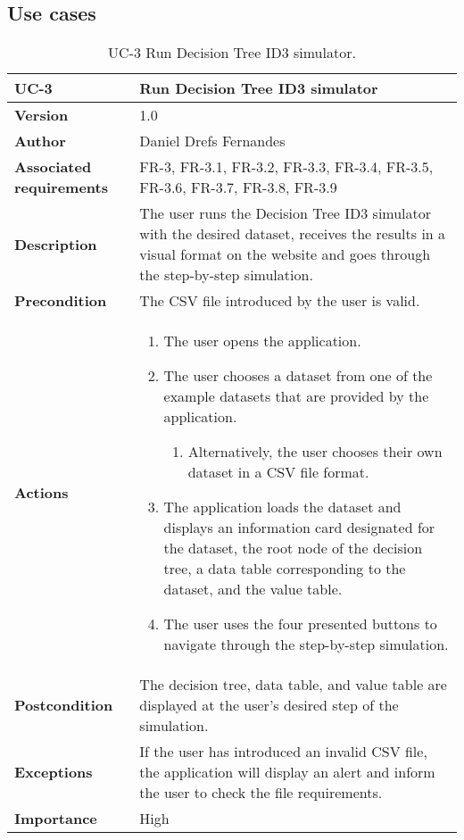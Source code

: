 \subsection{Use cases}
\begin{table}[p]
	\centering
	\begin{tabularx}{\linewidth}{ p{} p{} }
		\toprule
		\textbf{UC-3}    & \textbf{Run Decision Tree ID3 simulator}\\
		\toprule
		\textbf{Version}              & 1.0    \\
		\textbf{Author}                & Daniel Drefs Fernandes \\
		\textbf{Associated requirements} & FR-3, FR-3.1, FR-3.2, FR-3.3, FR-3.4, FR-3.5, FR-3.6, FR-3.7, FR-3.8, FR-3.9 \\
		\textbf{Description}          & The user runs the Decision Tree ID3 simulator with the desired dataset, receives the results in a visual format on the website and goes through the step-by-step simulation. \\
		\textbf{Precondition}         & The CSV file introduced by the user is valid. \\
		\textbf{Actions}             &
		\begin{enumerate}
			\def\labelenumi{\arabic{enumi}.}
			\tightlist
			\item The user opens the application.
			\item The user chooses a dataset from one of the example datasets that are provided by the application.
            \begin{enumerate}
                \item Alternatively, the user chooses their own dataset in a CSV file format.
            \end{enumerate}
            \item The application loads the dataset and displays an information card designated for the dataset, the root node of the decision tree, a data table corresponding to the dataset, and the value table.
            \item The user uses the four presented buttons to navigate through the step-by-step simulation.
		\end{enumerate}\\
		\textbf{Postcondition}        & The decision tree, data table, and value table are displayed at the user's desired step of the simulation. \\
		\textbf{Exceptions}          & If the user has introduced an invalid CSV file, the application will display an alert and inform the user to check the file requirements. \\
		\textbf{Importance}          & High \\
		\bottomrule
	\end{tabularx}
	\caption{UC-3 Run Decision Tree ID3 simulator.}
\end{table}
